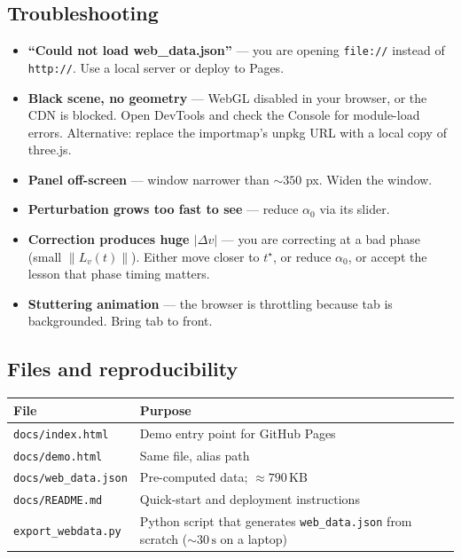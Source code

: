 \documentclass[11pt,a4paper]{article}
\begin{document}
\subsection{Troubleshooting}\label{sec:demo:trouble}

\begin{itemize}[leftmargin=*]
  \item \textbf{``Could not load web\_data.json''} --- you are opening \texttt{file://} instead of \texttt{http://}. Use a local server or deploy to Pages.
  \item \textbf{Black scene, no geometry} --- WebGL disabled in your browser, or the CDN is blocked. Open DevTools and check the Console for module-load errors. Alternative: replace the importmap's unpkg URL with a local copy of three.js.
  \item \textbf{Panel off-screen} --- window narrower than $\sim 350$ px. Widen the window.
  \item \textbf{Perturbation grows too fast to see} --- reduce $\alpha_0$ via its slider.
  \item \textbf{Correction produces huge $|\Delta v|$} --- you are correcting at a bad phase (small $\|L_v(t)\|$). Either move closer to $t^\star$, or reduce $\alpha_0$, or accept the lesson that phase timing matters.
  \item \textbf{Stuttering animation} --- the browser is throttling because tab is backgrounded. Bring tab to front.
\end{itemize}

\subsection{Files and reproducibility}\label{sec:demo:repro}

\begin{table}[H]
\centering
\begin{tabular}{@{}l l@{}}
\toprule
\textbf{File} & \textbf{Purpose} \\
\midrule
\texttt{docs/index.html}       & Demo entry point for GitHub Pages \\
\texttt{docs/demo.html}        & Same file, alias path \\
\texttt{docs/web\_data.json}   & Pre-computed data; $\approx 790\,\mathrm{KB}$ \\
\texttt{docs/README.md}        & Quick-start and deployment instructions \\
\texttt{export\_webdata.py}    & Python script that generates \texttt{web\_data.json} from scratch ($\sim 30\,\mathrm{s}$ on a laptop) \\
\bottomrule
\end{tabular}
\end{table}
\end{document}
